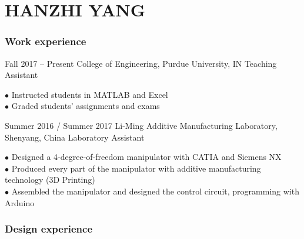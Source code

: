 \documentclass{tccv}
\begin{document}
\part{HANZHI YANG}

\section{Work experience}

\begin{eventlist}

\item{Fall 2017 -- Present}
     {College of Engineering, Purdue University, IN}
     {Teaching Assistant}

$\bullet$ Instructed students in MATLAB and Excel\\
$\bullet$ Graded students’ assignments and exams


\item{Summer 2016 / Summer 2017}
     {Li-Ming Additive Manufacturing Laboratory, Shenyang, China}
     {Laboratory Assistant }

$\bullet$ Designed a 4-degree-of-freedom manipulator with CATIA and Siemens NX\\
$\bullet$ Produced every part of the manipulator with additive manufacturing technology (3D Printing)\\
$\bullet$ Assembled the manipulator and designed the control circuit, programming with Arduino

\end{eventlist}

\section{Design experience}
\end{document}
